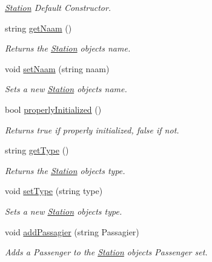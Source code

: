 \begin{DoxyCompactItemize}
\begin{DoxyCompactList}\small\item\em \hyperlink{classStation}{Station} Default Constructor. \end{DoxyCompactList}\item 
string \hyperlink{classStation_a7db91849f0d5bab0a4ac0aa4967721cf}{get\+Naam} ()
\begin{DoxyCompactList}\small\item\em Returns the \hyperlink{classStation}{Station} object\textquotesingle{}s name. \end{DoxyCompactList}\item 
void \hyperlink{classStation_a9838301eaa0d45561877bcebc19a663c}{set\+Naam} (string naam)
\begin{DoxyCompactList}\small\item\em Sets a new \hyperlink{classStation}{Station} object\textquotesingle{}s name. \end{DoxyCompactList}\item 
bool \hyperlink{classStation_aab182a50a2992afe0df4412f7de4b73d}{properly\+Initialized} ()
\begin{DoxyCompactList}\small\item\em Returns true if properly initialized, false if not. \end{DoxyCompactList}\item 
string \hyperlink{classStation_aac519858a1ac53608d24d78e4b9231ab}{get\+Type} ()
\begin{DoxyCompactList}\small\item\em Returns the \hyperlink{classStation}{Station} object\textquotesingle{}s type. \end{DoxyCompactList}\item 
void \hyperlink{classStation_a1a38a1c6db22cfda3c5885281252a3b9}{set\+Type} (string type)
\begin{DoxyCompactList}\small\item\em Sets a new \hyperlink{classStation}{Station} object\textquotesingle{}s type. \end{DoxyCompactList}\item 
void \hyperlink{classStation_a9584a65058bdf75254e3a2d79ddcdba1}{add\+Passagier} (string Passagier)
\begin{DoxyCompactList}\small\item\em Adds a Passenger to the \hyperlink{classStation}{Station} object\textquotesingle{}s Passenger set. \end{DoxyCompactList}\item 

\end{DoxyCompactItemize}
